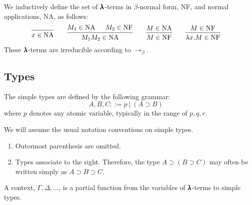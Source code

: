 \begin{definition}
  We inductively define the set of $\pmb{\lambda}$-terms in $\beta$-normal form, NF, and normal applications, NA, as follows:
  \[
    \begin{prooftree}
      \infer0{ x \in \text{NA} } 
    \end{prooftree}
    \qquad
    \begin{prooftree}
      \hypo{ M_1 \in \text{NA} }
      \hypo{ M_2 \in \text{NF} }            
      \infer2{ M_1 M_2 \in \text{NA} } 
    \end{prooftree}
    \qquad
    \begin{prooftree}
      \hypo{ M \in \text{NA} }
      \infer1{ M \in \text{NF} } 
    \end{prooftree}
    \qquad
    \begin{prooftree}
      \hypo{ M \in \text{NF} }
      \infer1{ \lambda x . M \in \text{NF} } 
    \end{prooftree}
  \]
  These $\pmb{\lambda}$-terms are irreducible according to $\to_\beta$.
\end{definition}


\subsection{Types}

\begin{definition}
  The simple types are defined by the following grammar:  
  \[
    A, B, C ::= p \ | \ (A \supset B)
  \]
  where $p$ denotes any atomic variable, typically in the range of $p, q, r$.
\end{definition}

\begin{notation}
  We will assume the usual notation conventions on simple types. 
  \begin{enumerate}
  \item Outermost parenthesis are omitted.
  \item Types associate to the right. Therefore, the type $A \supset (B \supset C)$ may often be written simply as $A \supset B \supset C$.
  \end{enumerate}
\end{notation}

\begin{definition}[Context]
  A context, $\Gamma, \Delta, \dots$, is a partial function from the variables of $\pmb{\lambda}$-terms to simple types.
\end{definition}

